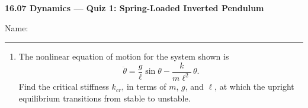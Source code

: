\documentclass[11pt,letterpaper]{article}
\begin{document}
\begin{center}
    {\Large \textbf{16.07 Dynamics --- Quiz 1: Spring-Loaded Inverted Pendulum}}
\end{center}

\vspace{4pt}
\begin{minipage}[t]{0.66\textwidth}
\vspace{0pt}
Name: \rule{3.2in}{0.4pt}

\vspace{14pt}
\begin{enumerate}[label=\textbf{\arabic*.}, leftmargin=*, itemsep=4pt, series=quiz]
\item The nonlinear equation of motion for the system shown is
\[
\ddot\theta = \frac{g}{\ell}\sin\theta - \frac{k}{m\ell^2}\,\theta .
\]
Find the critical stiffness $k_{cr}$, in terms of $m$, $g$, and $\ell$, at which the upright equilibrium transitions from stable to unstable.
\end{enumerate}
\end{minipage}%
\hfill
\end{document}

